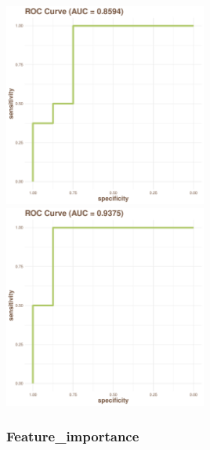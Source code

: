 \documentclass[
]{article}
\begin{document}
\includegraphics[width=0.5\textwidth,height=0.5\textheight]{../../Analysis_shotgun_PRJDB4176/03_ML/shotgun/atlas_binning/PRJDB4176_binning_best.model_draw_Roc_plot.pdf}
\includegraphics[width=0.5\textwidth,height=0.5\textheight]{../../Analysis_shotgun_PRJDB4176/03_ML/shotgun/krakens/PRJDB4176_best.model_draw_Roc_plot.pdf}

\hypertarget{feature_importance-1}{%
\subsubsection{Feature\_importance}\label{feature_importance-1}}
\end{document}
